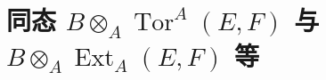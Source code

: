 \section{同态 \texorpdfstring{$B\otimes_{A}\operatorname{Tor}^{A}(E,F)$}{B@TorA(E,F)} 与 \texorpdfstring{$B\otimes_{A}\operatorname{Ext}_{A}(E,F)$}{B@ExtA(E,F)} 等}
